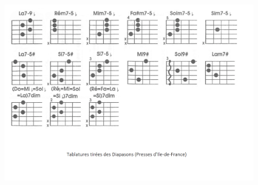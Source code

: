 \documentclass[9pt]{article}
\begin{document}
\begin{figure}[ht!]
    \centering
    \includegraphics[width=.95\linewidth]{photos_accords/accords_7.png}
\end{figure}
\end{document}
